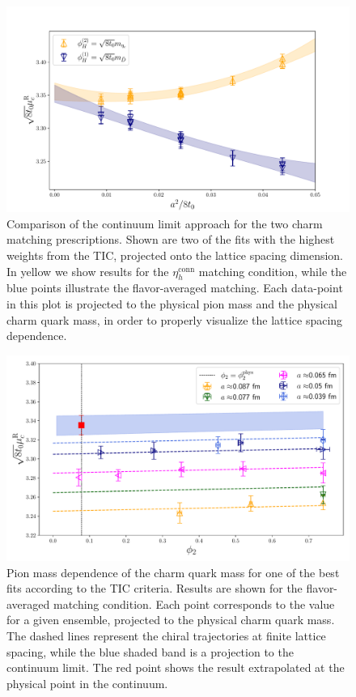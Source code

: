 \begin{figure}
	\centering 
	\includegraphics[scale=0.45]{./cap6/figs/mc/mc_cl_all_cat.pdf}
	\caption{Comparison of the continuum limit approach for the two  charm matching 
	prescriptions. Shown are two of the fits with the highest weights from the TIC, projected onto the lattice 
	spacing dimension. In yellow we show results for the $\eta_h^{\mathrm{conn}}$ matching condition, while  the blue 
	points illustrate  the flavor-averaged matching. Each data-point in this plot is projected to the 
	physical pion mass and the physical charm quark mass, in order to properly visualize the lattice 
	spacing dependence. }
	\label{fig:mc_continuum_limit}
\end{figure}

\begin{figure}
	\centering
	\includegraphics[scale=0.42]{./cap6/figs/mc/fit_phi2_muc_fl_ave.pdf}
	\caption{Pion mass dependence of the charm quark mass for one of the best  fits according to the TIC criteria. Results are shown for the flavor-averaged matching condition. Each point corresponds to the  value for a given ensemble, projected to the physical charm quark mass. The dashed lines represent the chiral trajectories at finite lattice spacing, while the blue shaded band is a projection to the continuum limit. The red point shows the result extrapolated at the physical point in the continuum. }
	\label{fig:mc_pion_dependence}
\end{figure}

